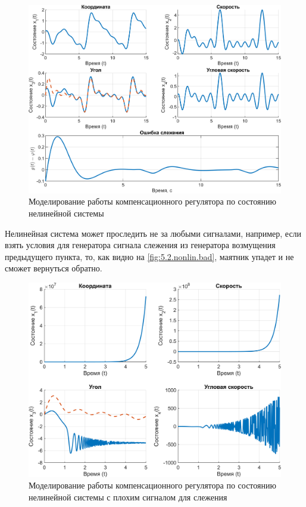 \begin{figure}[H]
    \centering
    \includegraphics[width=\linewidth]{figs/5.2.nonlin.png}
    \caption{Моделирование работы компенсационного регулятора по состоянию
    нелинейной системы}
    \label{fig:5.2.nonlin}
\end{figure}
\noindent Нелинейная система может проследить не за любыми сигналами, например,
если взять условия для генератора сигнала слежения из генератора возмущения
предыдущего пункта, то, как видно на  \autoref{fig:5.2.nonlin.bad},
маятник упадет и не сможет вернуться обратно.
\begin{figure}[H]
    \centering
    \includegraphics[width=\linewidth]{figs/5.2.nonlin.bad.png}
    \caption{Моделирование работы компенсационного регулятора по состоянию
    нелинейной системы с плохим сигналом для слежения}
    \label{fig:5.2.nonlin.bad}
\end{figure}

